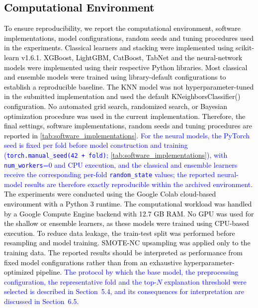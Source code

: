 \documentclass[a4paper,fleqn]{cas-sc}
\begin{document}
\subsection{\textcolor{black}{Computational Environment}}
\textcolor{black}{To ensure reproducibility, we report the computational environment, software implementations, model configurations, random seeds and tuning procedures used in the experiments. Classical learners and stacking were implemented using scikit-learn v1.6.1. XGBoost, LightGBM, CatBoost, TabNet and the neural-network models were implemented using their respective Python libraries.
Most classical and ensemble models were trained using library-default configurations to establish a reproducible baseline. The KNN model was not hyperparameter-tuned in the submitted implementation and used the default KNeighborsClassifier() configuration. No automated grid search, randomized search, or Bayesian optimization procedure was used in the current implementation. Therefore, the final settings, software implementations, random seeds and tuning procedures are reported in \cref{tab:software_implementations}. \textcolor{blue}{For the neural models, the PyTorch seed is fixed per fold before model construction and training (\texttt{torch.manual\_seed(42 + fold)}; \cref{tab:software_implementations}), with \texttt{num\_workers}=0 and CPU execution, and the classical and ensemble learners receive the corresponding per-fold \texttt{random\_state} values; the reported neural-model results are therefore exactly reproducible within the archived environment.}
The experiments were conducted using the Google Colab cloud-based environment with a Python 3 runtime. The computational workload was handled by a Google Compute Engine backend with 12.7 GB RAM. No GPU was used for the shallow or ensemble learners, as these models were trained using CPU-based execution.
To reduce data leakage, the train-test split was performed before resampling and model training. SMOTE-NC upsampling was applied only to the training data. The reported results should be interpreted as performance from fixed model configurations rather than from an exhaustive hyperparameter-optimized pipeline. \textcolor{blue}{The protocol by which the base model, the preprocessing configuration, the representative fold and the top-$N$ explanation threshold were selected is described in Section~5.4, and its consequences for interpretation are discussed in Section~6.5.}}
\end{document}
